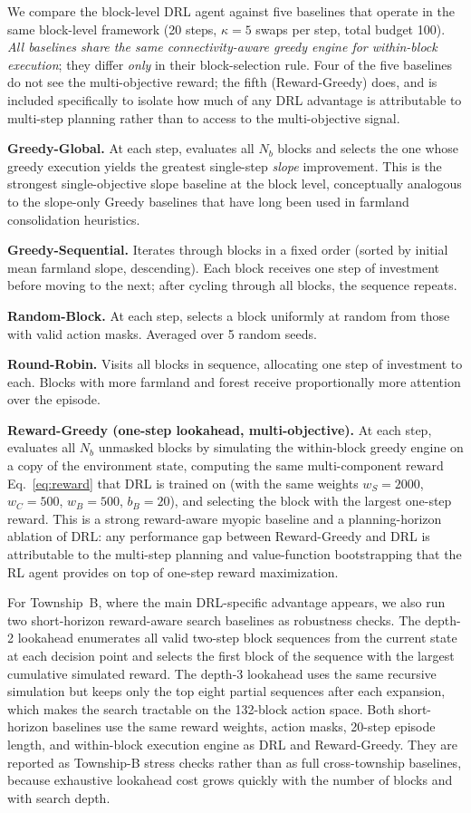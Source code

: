 \documentclass[preprint,12pt]{elsarticle}
\begin{document}
We compare the block-level DRL agent against five baselines that operate in the same block-level framework (20 steps, $\kappa = 5$ swaps per step, total budget 100). \textit{All baselines share the same connectivity-aware greedy engine for within-block execution}; they differ \textit{only} in their block-selection rule. Four of the five baselines do not see the multi-objective reward; the fifth (Reward-Greedy) does, and is included specifically to isolate how much of any DRL advantage is attributable to multi-step planning rather than to access to the multi-objective signal.

\textbf{Greedy-Global.} At each step, evaluates all $N_b$ blocks and selects the one whose greedy execution yields the greatest single-step \textit{slope} improvement. This is the strongest single-objective slope baseline at the block level, conceptually analogous to the slope-only Greedy baselines that have long been used in farmland consolidation heuristics.

\textbf{Greedy-Sequential.} Iterates through blocks in a fixed order (sorted by initial mean farmland slope, descending). Each block receives one step of investment before moving to the next; after cycling through all blocks, the sequence repeats.

\textbf{Random-Block.} At each step, selects a block uniformly at random from those with valid action masks. Averaged over 5 random seeds.

\textbf{Round-Robin.} Visits all blocks in sequence, allocating one step of investment to each. Blocks with more farmland and forest receive proportionally more attention over the episode.

\textbf{Reward-Greedy (one-step lookahead, multi-objective).} At each step, evaluates all $N_b$ unmasked blocks by simulating the within-block greedy engine on a copy of the environment state, computing the same multi-component reward Eq.~\ref{eq:reward} that DRL is trained on (with the same weights $w_S=2000$, $w_C=500$, $w_B=500$, $b_B=20$), and selecting the block with the largest one-step reward. This is a strong reward-aware myopic baseline and a planning-horizon ablation of DRL: any performance gap between Reward-Greedy and DRL is attributable to the multi-step planning and value-function bootstrapping that the RL agent provides on top of one-step reward maximization.

For Township~B, where the main DRL-specific advantage appears, we also run two short-horizon reward-aware search baselines as robustness checks. The depth-2 lookahead enumerates all valid two-step block sequences from the current state at each decision point and selects the first block of the sequence with the largest cumulative simulated reward. The depth-3 lookahead uses the same recursive simulation but keeps only the top eight partial sequences after each expansion, which makes the search tractable on the 132-block action space. Both short-horizon baselines use the same reward weights, action masks, 20-step episode length, and within-block execution engine as DRL and Reward-Greedy. They are reported as Township-B stress checks rather than as full cross-township baselines, because exhaustive lookahead cost grows quickly with the number of blocks and with search depth.
\end{document}
